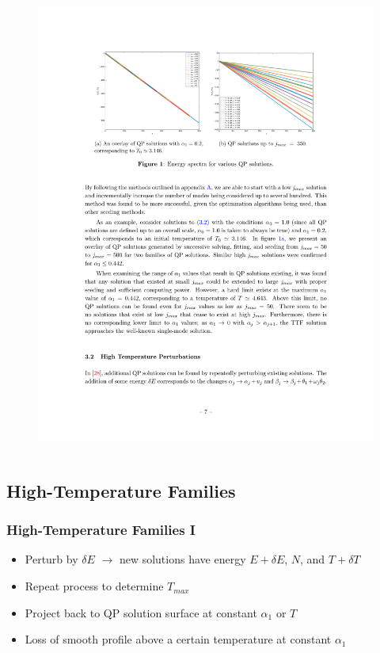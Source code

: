 \documentclass[mathserif,10pt]{beamer}
\newcommand{\bi}{\begin{itemize}}
\newcommand{\ei}{\end{itemize}}
\newcommand{\its}{\item}
\begin{document}
{{\begin{columns}
\begin{figure}
  \includegraphics[scale=0.9]{families}
  \end{figure}
  \end{columns}
  \begin{center}
  \end{center}
  
}


\subsection{High-Temperature Families}
\frame
{
  \frametitle{High-Temperature Families I}
  \bi
  \its Perturb by $\delta E$ $\to$ new solutions have energy $E + \delta E$, $N$, and $T + \delta T$
  \its Repeat process to determine $T_{max}$
  \its Project back to QP solution surface at constant $\alpha_1$ or $T$
  \its Loss of smooth profile above a certain temperature at \alert<1>{constant $\alpha_1$} 
  \ei
  
}}
\end{document}
